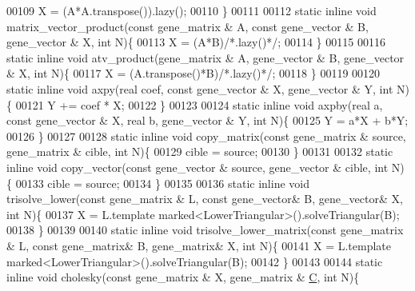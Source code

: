 \begin{DoxyCode}
00109     X = (A*A.transpose()).lazy();
00110   \}
00111 
00112   \textcolor{keyword}{static} \textcolor{keyword}{inline} \textcolor{keywordtype}{void} matrix\_vector\_product(\textcolor{keyword}{const} gene\_matrix & A, \textcolor{keyword}{const} gene\_vector & B, gene\_vector & X, \textcolor{keywordtype}{
      int} N)\{
00113     X = (A*B)\textcolor{comment}{/*.lazy()*/};
00114   \}
00115 
00116   \textcolor{keyword}{static} \textcolor{keyword}{inline} \textcolor{keywordtype}{void} atv\_product(gene\_matrix & A, gene\_vector & B, gene\_vector & X, \textcolor{keywordtype}{int} N)\{
00117     X = (A.transpose()*B)\textcolor{comment}{/*.lazy()*/};
00118   \}
00119 
00120   \textcolor{keyword}{static} \textcolor{keyword}{inline} \textcolor{keywordtype}{void} axpy(real coef, \textcolor{keyword}{const} gene\_vector & X, gene\_vector & Y, \textcolor{keywordtype}{int} N)\{
00121     Y += coef * X;
00122   \}
00123 
00124   \textcolor{keyword}{static} \textcolor{keyword}{inline} \textcolor{keywordtype}{void} axpby(real a, \textcolor{keyword}{const} gene\_vector & X, real b, gene\_vector & Y, \textcolor{keywordtype}{int} N)\{
00125     Y = a*X + b*Y;
00126   \}
00127 
00128   \textcolor{keyword}{static} \textcolor{keyword}{inline} \textcolor{keywordtype}{void} copy\_matrix(\textcolor{keyword}{const} gene\_matrix & source, gene\_matrix & cible, \textcolor{keywordtype}{int} N)\{
00129     cible = source;
00130   \}
00131 
00132   \textcolor{keyword}{static} \textcolor{keyword}{inline} \textcolor{keywordtype}{void} copy\_vector(\textcolor{keyword}{const} gene\_vector & source, gene\_vector & cible, \textcolor{keywordtype}{int} N)\{
00133     cible = source;
00134   \}
00135 
00136   \textcolor{keyword}{static} \textcolor{keyword}{inline} \textcolor{keywordtype}{void} trisolve\_lower(\textcolor{keyword}{const} gene\_matrix & L, \textcolor{keyword}{const} gene\_vector& B, gene\_vector& X, \textcolor{keywordtype}{int} N)\{
00137     X = L.template marked<LowerTriangular>().solveTriangular(B);
00138   \}
00139 
00140   \textcolor{keyword}{static} \textcolor{keyword}{inline} \textcolor{keywordtype}{void} trisolve\_lower\_matrix(\textcolor{keyword}{const} gene\_matrix & L, \textcolor{keyword}{const} gene\_matrix& B, gene\_matrix& X, \textcolor{keywordtype}{int}
       N)\{
00141     X = L.template marked<LowerTriangular>().solveTriangular(B);
00142   \}
00143 
00144   \textcolor{keyword}{static} \textcolor{keyword}{inline} \textcolor{keywordtype}{void} cholesky(\textcolor{keyword}{const} gene\_matrix & X, gene\_matrix & \hyperlink{group___core___module}{C}, \textcolor{keywordtype}{int} N)\{

\end{DoxyCode}
